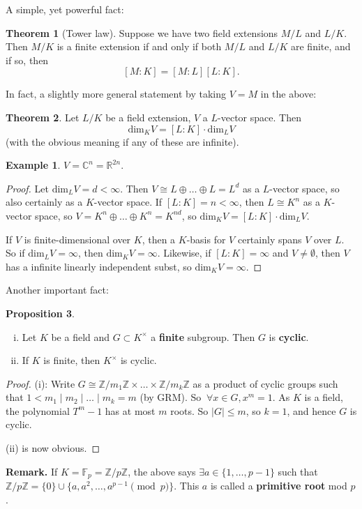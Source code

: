\documentclass{article}
\theoremstyle{definition}
\newtheorem{theorem}{Theorem}[section]
\newtheorem{prop}[theorem]{Proposition}
\newtheorem{example}{Example}[section]
\begin{document}
A simple, yet powerful fact:
\begin{theorem}[Tower law]
    Suppose we have two field extensions $M/L$ and $L/K$. Then $M/K$ is a finite extension if and only if both $M/L$ and $L/K$ are finite, and if so, then \[
    [M : K] = [M : L][L : K].
    \]
\end{theorem}
In fact, a slightly more general statement by taking $V=M$ in the above:
\begin{theorem}
    Let $L/K$ be a field extension, $V$ a $L$-vector space. Then $$\text{dim}_K V = [L : K] \cdot \text{dim}_L V$$
    (with the obvious meaning if any of these are infinite).
\end{theorem}
\begin{example}
    $V = \mathbb{C}^{n}= \mathbb{R}^{2n}$.
\end{example}
\begin{proof}
    Let $\text{dim}_L V = d < \infty$. Then $V \cong L \oplus \ldots \oplus L = L^d$ as a $L$-vector space, so also certainly as a $K$-vector space. If $[L:K] = n < \infty$, then $L \cong K^n$ as a $K$-vector space, so $V = K^n \oplus \ldots \oplus K^n = K^{nd}$, so $\text{dim}_K V = [L : K] \cdot \text{dim}_L V$.
    \vspace{1mm}

    If $V$ is finite-dimensional over $K$, then a $K$-basis for $V$ certainly spans $V$ over $L$. So if $\text{dim}_L V = \infty$, then $\text{dim}_K V = \infty$. Likewise, if $[L:K] = \infty$ and $V \neq \emptyset$, then $V$ has a infinite linearly independent subst, so $\text{dim}_K V = \infty$.
\end{proof}
Another important fact:
\begin{prop}\label{3.5}
    \begin{enumerate}[(i)]
        \item Let $K$ be a field and $G \subset K^\times$ a \textbf{finite} subgroup. Then $G$ is \textbf{cyclic}.
        \item If $K$ is finite, then $K^{\times}$ is cyclic.
    \end{enumerate}
\end{prop}
\begin{proof}
    (i): Write $G \cong \mathbb{Z}/m_1\mathbb{Z} \times \ldots \times \mathbb{Z}/m_k\mathbb{Z}$ as a product of cyclic groups such that $1<m_1 \mid m_2\mid \ldots\mid m_k = m$ (by GRM). So $~\forall x \in G, x^m = 1$. As $K$ is a field, the polynomial $T^m-1$ has at most $m$ roots. So $|G|\le m$, so $k=1$, and hence $G$ is cyclic.

    (ii) is now obvious.
\end{proof}
\textbf{Remark.} If $K=\mathbb{F}_p = \mathbb{Z}/p\mathbb{Z}$, the above says $\exists a \in \{1,\ldots,p-1\}$ such that $\mathbb{Z}/p\mathbb{Z} = \{0\} \cup \{a,a^2,\ldots,a^{p-1} \pmod{p}\}$. This $a$ is called a \textbf{primitive root} mod $p$.
\end{document}
